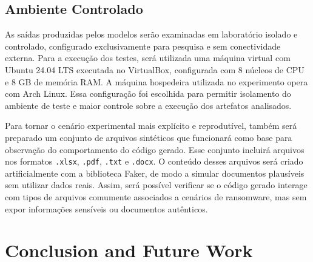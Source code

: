 \documentclass[12pt]{article}
\begin{document}
\subsection{Ambiente Controlado}
As saídas produzidas pelos modelos serão examinadas em laboratório isolado e controlado, configurado exclusivamente para pesquisa e sem conectividade externa. Para a execução dos testes, será utilizada uma máquina virtual com Ubuntu 24.04 LTS executada no VirtualBox, configurada com 8 núcleos de CPU e 8 GB de memória RAM. A máquina hospedeira utilizada no experimento opera com Arch Linux. Essa configuração foi escolhida para permitir isolamento do ambiente de teste e maior controle sobre a execução dos artefatos analisados.

Para tornar o cenário experimental mais explícito e reprodutível, também será preparado um conjunto de arquivos sintéticos que funcionará como base para observação do comportamento do código gerado. Esse conjunto incluirá arquivos nos formatos \texttt{.xlsx}, \texttt{.pdf}, \texttt{.txt} e \texttt{.docx}. O conteúdo desses arquivos será criado artificialmente com a biblioteca Faker, de modo a simular documentos plausíveis sem utilizar dados reais. Assim, será possível verificar se o código gerado interage com tipos de arquivos comumente associados a cenários de ransomware, mas sem expor informações sensíveis ou documentos autênticos.

\section{Conclusion and Future Work}




\renewcommand{\refname}{References}



\end{document}
